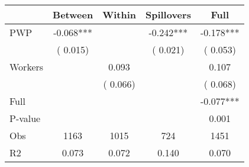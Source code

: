 
\begin{tabular}{l*{4}{c}}\hline&\multicolumn{1}{c}{Between}&\multicolumn{1}{c}{Within}&\multicolumn{1}{c}{Spillovers}&\multicolumn{1}{c}{Full}\\ \hline
 PWP           &             -0.068***      &                                               &       -0.242*** &        -0.178***                            \\ 
                               &        (       0.015)           &                                       &       (       0.021)     &      (       0.053)                                           \\ 
 Workers       &                                               &        0.093    &                                &             0.107                            \\ 
                               &                                               & (       0.066)                  &                                        &      (       0.068)                                           \\ 
\hline                                                                                                                                                                                                                                            
 Full                  &                                               &                                               &                                        &            -0.077***                                     \\ 
 P-value               &                                               &                                               &                                        &             0.001                                           \\ 
 Obs                   &               1163               &       1015                       &       724                &              1451                                               \\ 
 R2                    &                      0.073              &              0.072                      &              0.140               &                     0.070                                              \\ 
\hline \end{tabular}                                                                                                                                                                                                              